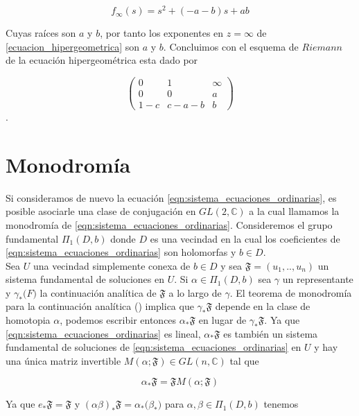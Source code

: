 $$ f_{\infty}(s) = s^{2} + (-a-b)s +ab$$

Cuyas ra\'ices son $a$ y $b$, por tanto los exponentes en $z=\infty $ de \ref{ecuacion_hipergeometrica}  son $a$ y $b$. Concluimos con el esquema de $Riemann$ de la ecuaci\'on hipergeom\'etrica  esta dado por

\[ \left( \begin{array}{ccc}
0 & 1 & \infty \\
0 & 0 & a \\
1-c &c-a-b & b  \end{array} \right)\].

\section{Monodrom\'ia}

Si consideramos de nuevo la ecuaci\'on \ref{eqn:sistema_ecuaciones_ordinarias}, es posible asociarle una clase de conjugaci\'on en $GL(2,\mathbb{C})$ a la cual llamamos la monodrom\'ia de \ref{eqn:sistema_ecuaciones_ordinarias}. Consideremos el grupo fundamental $\Pi_{1} (D,b)$ donde $D$ es una vecindad en la cual los coeficientes de \ref{eqn:sistema_ecuaciones_ordinarias} son holomorfas y $b \in D$.\\

Sea $U$ una vecindad simplemente conexa de $b \in D $ y sea $\mathfrak{F}= (u_{1},..,u_{n})$ un sistema fundamental de soluciones en $U$. Si $\alpha \in \Pi_{1}(D,b)$ sea $\gamma$ un representante y $\gamma_{*} \mathfrak(F)$ la continuaci\'on anal\'itica de $\mathfrak{F} $ a lo largo de $\gamma$. El teorema de monodrom\'ia para la continuaci\'on anal\'itica (\cite{gausspainleve}) implica que $\gamma_{*} \mathfrak{F}$ depende en la clase de homotopia $\alpha$, podemos escribir entonces $\alpha_{*} \mathfrak{F}$ en lugar de $\gamma_{*} \mathfrak{F}$. Ya que \ref{eqn:sistema_ecuaciones_ordinarias} es lineal, $\alpha_{*} \mathfrak{F}$ es tambi\'en un sistema fundamental de soluciones de \ref{eqn:sistema_ecuaciones_ordinarias} en $U$ y hay una \'unica matriz invertible $M(\alpha; \mathfrak{F}) \in GL(n,\mathbb{C})$ tal que

\begin{equation} \label{relacionmatrizsisfun}
\alpha_{*} \mathfrak{F} = \mathfrak{F} M(\alpha;\mathfrak{F})
\end{equation}

Ya que $e_{*} \mathfrak{F} = \mathfrak{F}$ y $(\alpha \beta)_{*} \mathfrak{F} = \alpha_{*} (\beta_{*} \mathfrak) $ para $\alpha ,\beta \in \Pi_{1} (D,b) $ tenemos

